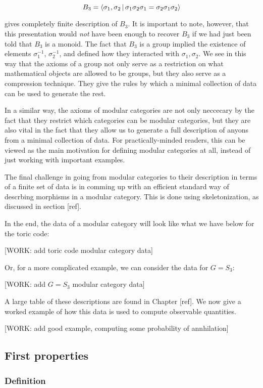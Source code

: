 $$B_3=\Braket{\sigma_1, \sigma_2 | \sigma_1 \sigma_2 \sigma_1 = \sigma_2 \sigma_1 \sigma_2}$$

gives  completely finite description of $B_3$. It is important to note, however, that this presentation would \textit{not} have been enough to recover $B_3$ if we had just been told that $B_3$ is a monoid. The fact that $B_3$ is a group implied the existence of elements $\sigma_1^{-1}$, $\sigma_{2}^{-1}$, and defined how they interacted with $\sigma_1,\sigma_2$. We see in this way that the axioms of a group not only serve as a restriction on what mathematical objects are allowed to be groups, but they also serve as a compression technique. They give the rules by which a minimal collection of data can be used to generate the rest.

In a similar way, the axioms of modular categories are not only neccecary by the fact that they restrict which categories can be modular categories, but they are also vital in the fact that they allow us to generate a full description of anyons from a minimal collection of data. For practically-minded readers, this can be viewed as the main motivation for defining modular categories at all, instead of just working with important examples.

The final challenge in going from modular categories to their description in terms of a finite set of data is in comming up with an efficient standard way of descrbing morphisms in a modular category. This is done using skeletonization, as discussed in section [ref].

In the end, the data of a modular category will look like what we have below for the toric code:

[WORK: add toric code modular category data]

Or, for a more complicated example, we can consider the data for $G=S_3$:

[WORK: add $G=S_3$ modular category data]

A large table of these descriptions are found in Chapter [ref]. We now give a worked example of how this data is used to compute observable quantities.

[WORK: add good example, computing some probability of annhilation]

\subsection{First properties}

\subsubsection{Definition}


